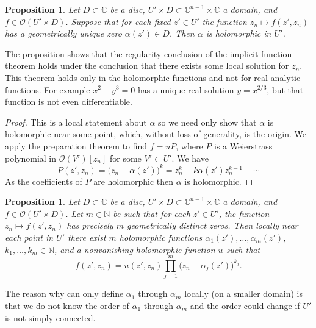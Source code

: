 \documentclass[12pt,openany]{book}
\newcommand{\C}{{\mathbb{C}}}
\newcommand{\N}{{\mathbb{N}}}
\newcommand{\sO}{{\mathcal{O}}}
\theoremstyle{plain}
\newtheorem{prop}[thm]{Proposition}
\theoremstyle{remark}
\theoremstyle{definition}
\theoremstyle{exercise}
\theoremstyle{example}
\begin{document}
\begin{prop} \label{prop:roothol}
Let $D \subset \C$ be a disc, 
$U' \times D \subset \C^{n-1} \times \C$ a domain,
and
$f \in \sO(U' \times D)$.
Suppose that for each fixed $z' \in U'$ the function
$z_n \mapsto f(z',z_n)$ has a geometrically unique zero $\alpha(z') \in D$.  Then $\alpha$ is
holomorphic in $U'$.
\end{prop}

The proposition shows that the regularity conclusion of the implicit
function theorem holds under the conclusion that there exists some local
solution for $z_n$.  This theorem holds only in the holomorphic
functions and not for real-analytic functions.  For example $x^2-y^3 = 0$ has a
unique real solution $y = x^{2/3}$, but that function is not even
differentiable.

\begin{proof}
This is a local statement about $\alpha$ so we need only show
that $\alpha$ is holomorphic near some point, which, without loss
of generality, is the origin.
We apply the preparation
theorem to find $f = u P$,
where $P$ is a
Weierstrass polynomial in $\sO(V')[z_n]$ for some $V' \subset U'$.
We have
\begin{equation*}
P(z',z_n) = {\bigl(z_n-\alpha(z') \bigr)}^k = z_n^k - k \alpha(z') z_n^{k-1}
+ \cdots
\end{equation*}
As the coefficients of $P$ are holomorphic then $\alpha$ is holomorphic.
\end{proof}

\begin{prop} \label{prop:rootshol}
Let $D \subset \C$ be a disc, 
$U' \times D \subset \C^{n-1} \times \C$ a domain,
and
$f \in \sO(U' \times D)$.
Let $m \in \N$ be such that
for each $z' \in U'$, the function $z_n \mapsto f(z',z_n)$ has
precisely $m$ geometrically distinct zeros.
Then locally near each point in $U'$ there exist $m$ holomorphic functions
$\alpha_1(z'),\ldots,\alpha_m(z')$,
$k_1,\ldots,k_m \in \N$,
and a nonvanishing holomorphic function $u$
such that
\begin{equation*}
f(z',z_n) = u(z',z_n) \prod_{j=1}^m {\bigl( z_n - \alpha_j(z') \bigr)}^{k_j}
.
\end{equation*}
\end{prop}

The reason why can only define $\alpha_1$ through $\alpha_m$ locally (on a
smaller domain) is that we do not know
the order of $\alpha_1$ through $\alpha_m$ and the order could change if
$U'$ is not simply connected.
\end{document}
